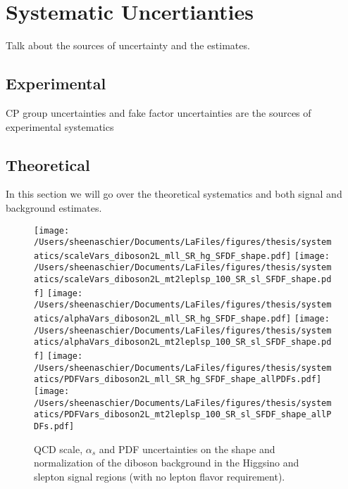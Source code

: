 \chapter{Systematic Uncertianties}
\label{sec:syst}
Talk about the sources of uncertainty and the estimates.

\section{Experimental}
\label{sec:systexp}
CP group uncertainties and fake factor uncertainties are the sources of experimental systematics

\section{Theoretical}
\label{sec:systthy}

In this section we will go over the theoretical systematics and both signal and background estimates.
 \begin{figure}
  \centering
  \texttt{[image: /Users/sheenaschier/Documents/LaFiles/figures/thesis/systematics/scaleVars\_diboson2L\_mll\_SR\_hg\_SFDF\_shape.pdf]}
  \texttt{[image: /Users/sheenaschier/Documents/LaFiles/figures/thesis/systematics/scaleVars\_diboson2L\_mt2leplsp\_100\_SR\_sl\_SFDF\_shape.pdf]}
 \texttt{[image: /Users/sheenaschier/Documents/LaFiles/figures/thesis/systematics/alphaVars\_diboson2L\_mll\_SR\_hg\_SFDF\_shape.pdf]}
 \texttt{[image: /Users/sheenaschier/Documents/LaFiles/figures/thesis/systematics/alphaVars\_diboson2L\_mt2leplsp\_100\_SR\_sl\_SFDF\_shape.pdf]}
  \texttt{[image: /Users/sheenaschier/Documents/LaFiles/figures/thesis/systematics/PDFVars\_diboson2L\_mll\_SR\_hg\_SFDF\_shape\_allPDFs.pdf]}
  \texttt{[image: /Users/sheenaschier/Documents/LaFiles/figures/thesis/systematics/PDFVars\_diboson2L\_mt2leplsp\_100\_SR\_sl\_SFDF\_shape\_allPDFs.pdf]}
 \caption{QCD scale, $\alpha_{s}$ and PDF uncertainties on the shape and normalization of the diboson background in the Higgsino and slepton signal regions (with no lepton flavor requirement).}
\label{fig:theoryUncsVV}
 \end{figure}
 
